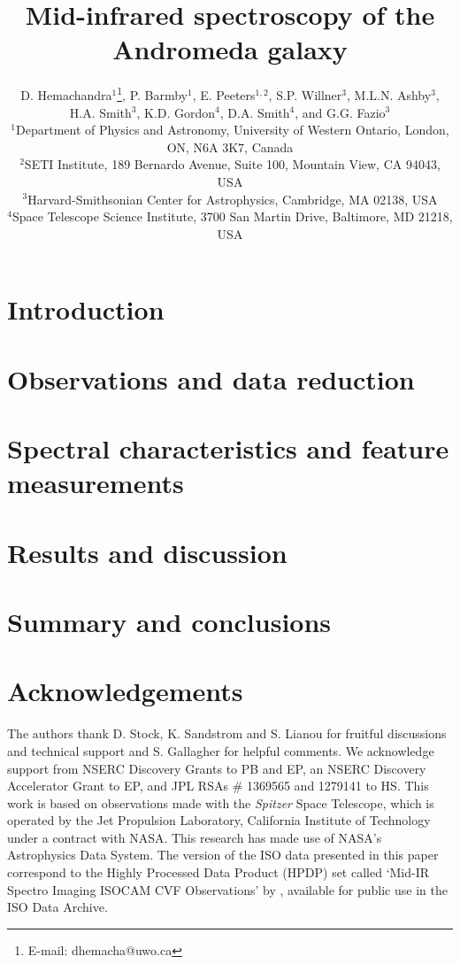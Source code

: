 \documentclass[useAMS,usenatbib,a4paper]{mn2e}
\title[Mid-infrared spectroscopy of M31]{Mid-infrared spectroscopy of the Andromeda galaxy}
\author[D. Hemachandra et al.]
{D. Hemachandra$^{1}$\thanks{E-mail: dhemacha@uwo.ca},
P. Barmby$^{1}$, 
E. Peeters$^{1,2}$, 
S.P. Willner$^{3}$, 
M.L.N. Ashby$^{3}$,
H.A. Smith$^{3}$, 
\newauthor 
K.D. Gordon$^{4}$,
D.A. Smith$^{4}$,
and
G.G. Fazio$^{3}$\\
$^{1}$Department of Physics and Astronomy, University of Western Ontario, London, ON, N6A 3K7, Canada\\
$^{2}$SETI Institute, 189 Bernardo Avenue, Suite 100, Mountain View, CA 94043, USA\\
$^{3}$Harvard-Smithsonian Center for Astrophysics, Cambridge, MA 02138, USA\\
$^{4}$Space Telescope Science Institute, 3700 San Martin Drive, Baltimore, MD 21218, USA
}
\begin{document}
\date{}

\maketitle

\label{firstpage}



\section{Introduction}



\section{Observations and data reduction}



\section{Spectral characteristics and feature measurements}
\label{sect:data_analysis}



\section{Results and discussion}





\section{Summary and conclusions}
\label{sect:summary}



\section*{Acknowledgements}

The authors thank D. Stock, K. Sandstrom and S. Lianou for fruitful discussions and technical support
and S. Gallagher for helpful comments.
We acknowledge support from NSERC Discovery Grants to PB and EP, an NSERC Discovery Accelerator Grant to EP,
and JPL RSAs \# 1369565 and 1279141 to HS.
This work is based on observations made with the {\em Spitzer} Space Telescope, which is operated by the 
Jet Propulsion Laboratory, California Institute of Technology under a contract with NASA.
This research has made use of NASA's Astrophysics Data System.
The version of the ISO data presented in this paper correspond to the Highly Processed Data Product (HPDP) set called `Mid-IR Spectro Imaging ISOCAM CVF Observations'
by \citet{Boulanger_F_2005}, available for public use in the ISO Data Archive.



{}

\bsp

\label{lastpage}
\end{document}
